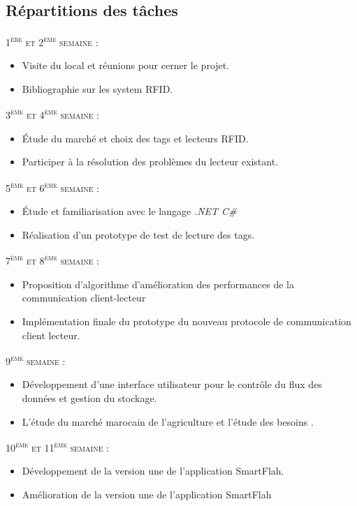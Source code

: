 \documentclass[11pt, a4paper, twoside]{book}
\begin{document}
\subsection{Répartitions des tâches}
\noindent
\textsc{1\textsuperscript{ère} et 2\textsuperscript{ème} semaine :}
\begin{itemize}
\item Visite du local et réunions pour cerner le projet.
\item Bibliographie sur les system RFID.
\end{itemize}
\textsc{3\textsuperscript{ème} et 4\textsuperscript{ème} semaine :}
\begin{itemize}
\item Étude du marché et choix des tags et lecteurs RFID.
\item Participer à la résolution des problèmes du lecteur existant.
\end{itemize}
\textsc{5\textsuperscript{ème} et 6\textsuperscript{ème} semaine :}
\begin{itemize}
\item Étude et familiarisation avec le langage \emph{.NET  C\#}
\item Réalisation d'un prototype de test de lecture des tags.
\end{itemize}
\textsc{7\textsuperscript{ème} et 8\textsuperscript{ème} semaine :}
\begin{itemize}
\item Proposition d'algorithme d'amélioration des performances de la communication client-lecteur
\item Implémentation finale du prototype du nouveau protocole de communication client lecteur.
\end{itemize}
\textsc{9\textsuperscript{ème} semaine :}  
\begin{itemize}
\item Développement d'une interface utilisateur pour le contrôle du flux des données et gestion du stockage.
\item L'étude du marché marocain de l'agriculture et l'étude des besoins .
\end{itemize}
\textsc{10\textsuperscript{ème} et 11\textsuperscript{ème} semaine :}
\begin{itemize}
\item Développement de la version une de l'application SmartFlah.
\item Amélioration de la version une de l'application SmartFlah
\end{itemize}
\end{document}
